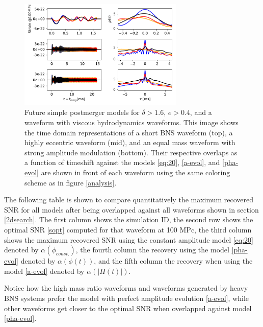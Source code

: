 \begin{figure}[hbt!]
\begin{center}
\includegraphics[width=0.7\textwidth, angle=0]{images/Data_analysis/results/phi-A2.pdf}
\captionsetup{width=0.8\textwidth}
\caption[Future simple postmerger models for $\delta>1.6$, $e>0.4$, and a waveform with viscous hydrodynamics waveforms]{Future simple postmerger models for $\delta>1.6$, $e>0.4$, and a waveform with viscous hydrodynamics waveforms. This image shows the time domain representations of a short BNS waveform (top), a highly eccentric waveform (mid), and an equal mass waveform with strong amplitude modulation (bottom). Their respective overlaps as a function of timeshift against the models \ref{eq:20}, \ref{a-evol}, and \ref{pha-evol} are shown in front of each waveform using the same coloring scheme as in figure \ref{analysis}.}
\label{ncejn}
\end{center}
\end{figure}
\FloatBarrier


The following table is shown to compare quantitatively the maximum recovered SNR for all models after being overlapped against all waveforms shown in section \ref{2dsearch}. The first column shows the simulation ID, the second row shows the optimal SNR \ref{sopt} computed for that waveform at 100 MPc, the third column shows the maximum recovered SNR using the constant amplitude model \ref{eq:20} denoted by $\alpha(\phi_{const.})$, the fourth column the recovery using the model \ref{pha-evol} denoted by $\alpha(\phi(t))$, and the fifth column the recovery when using the model \ref{a-evol} denoted by $\alpha(|H(t)|)$.

Notice how the high mass ratio waveforms and waveforms generated by heavy BNS systems prefer the model with perfect amplitude evolution \ref{a-evol}, while other waveforms get closer to the optimal SNR when overlapped against model \ref{pha-evol}.


